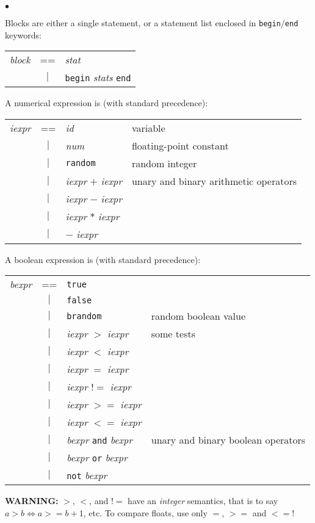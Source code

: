 \documentclass[twosides]{report}
\newenvironment{mylist}
        {\vskip-3mm\begin{list}{$\bullet$}{\setlength{\leftmargin}{.5cm}}}
        {\end{list}}
\begin{document}
\begin{mylist}
\item Blocks are either a single statement, or a statement list enclosed in 
{\tt begin}/{\tt end} keywords:\\
\nopagebreak
\begin{tabular}{lcl}
{\it block}&==& {\em stat}\\
&$|$&{\tt begin} {\em stats} {\tt end}\\
\end{tabular}

\item A numerical expression is (with standard precedence):\\
\nopagebreak
\begin{tabular}{lcll}
{\it iexpr}&==&{\em id}&variable\\
&$|$& {\em num}&floating-point constant\\
&$|$& {\tt random} & random integer\\
&$|$& {\em iexpr} $+$ {\em iexpr}&unary and binary arithmetic operators\\
&$|$& {\em iexpr} $-$ {\em iexpr}\\
&$|$& {\em iexpr} $*$ {\em iexpr}\\
&$|$& $-$ {\em iexpr}\\
\end{tabular}

\item A boolean expression is (with standard precedence):\\
\nopagebreak
\begin{tabular}{lcll}
{\it bexpr}&==&{\tt true}\\
&$|$& {\tt false}\\
&$|$& {\tt brandom} & random boolean value\\
&$|$& {\em iexpr} $>$ {\em iexpr}& some tests\\
&$|$& {\em iexpr} $<$ {\em iexpr}\\
&$|$& {\em iexpr} $=$ {\em iexpr}\\
&$|$& {\em iexpr} $!=$ {\em iexpr}\\
&$|$& {\em iexpr} $>=$ {\em iexpr}\\
&$|$& {\em iexpr} $<=$ {\em iexpr}\\
&$|$& {\em bexpr} {\tt and} {\em bexpr}&unary and binary boolean operators\\
&$|$& {\em bexpr} {\tt or} {\em bexpr}\\
&$|$& {\tt not} {\em bexpr}\\
\end{tabular}

{\bf WARNING:} $>$, $<$, and $!=$ have an {\em integer\/} semantics, that
is to say $a>b\iff a>=b+1$, etc.
To compare floats, use only $=$, $>=$ and $<=$!

\end{mylist}
\end{document}
